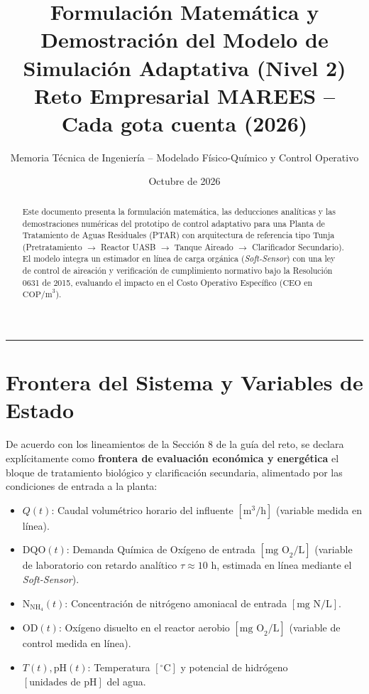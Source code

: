 \documentclass[11pt, a4paper]{article}
\title{\textbf{\textcolor{mareesblue}{Formulación Matemática y Demostración del Modelo de Simulación Adaptativa (Nivel 2)}}\\[0.4em]
\large Reto Empresarial MAREES -- Cada gota cuenta (2026)}
\author{Memoria Técnica de Ingeniería -- Modelado Físico-Químico y Control Operativo}
\date{Octubre de 2026}
\begin{document}
\maketitle

\begin{abstract}
Este documento presenta la formulación matemática, las deducciones analíticas y las demostraciones numéricas del prototipo de control adaptativo para una Planta de Tratamiento de Aguas Residuales (PTAR) con arquitectura de referencia tipo Tunja (Pretratamiento $\rightarrow$ Reactor UASB $\rightarrow$ Tanque Aireado $\rightarrow$ Clarificador Secundario). El modelo integra un estimador en línea de carga orgánica (\textit{Soft-Sensor}) con una ley de control de aireación y verificación de cumplimiento normativo bajo la Resolución 0631 de 2015, evaluando el impacto en el Costo Operativo Específico ($\text{CEO}$ en $\text{COP/m}^3$).
\end{abstract}

\tableofcontents
\vspace{1em}
\hrule
\vspace{1em}

\section{Frontera del Sistema y Variables de Estado}

De acuerdo con los lineamientos de la Sección 8 de la guía del reto, se declara explícitamente como \textbf{frontera de evaluación económica y energética} el bloque de tratamiento biológico y clarificación secundaria, alimentado por las condiciones de entrada a la planta:

\begin{itemize}
    \item $Q(t)$: Caudal volumétrico horario del influente $\left[\text{m}^3/\text{h}\right]$ (variable medida en línea).
    \item $\text{DQO}(t)$: Demanda Química de Oxígeno de entrada $\left[\text{mg O}_2/\text{L}\right]$ (variable de laboratorio con retardo analítico $\tau \approx 10\text{ h}$, estimada en línea mediante el \textit{Soft-Sensor}).
    \item $\text{N}_{\text{NH}_4}(t)$: Concentración de nitrógeno amoniacal de entrada $\left[\text{mg N/L}\right]$.
    \item $\text{OD}(t)$: Oxígeno disuelto en el reactor aerobio $\left[\text{mg O}_2/\text{L}\right]$ (variable de control medida en línea).
    \item $T(t), \text{pH}(t)$: Temperatura $\left[^\circ\text{C}\right]$ y potencial de hidrógeno $\left[\text{unidades de pH}\right]$ del agua.
\end{itemize}
\end{document}
